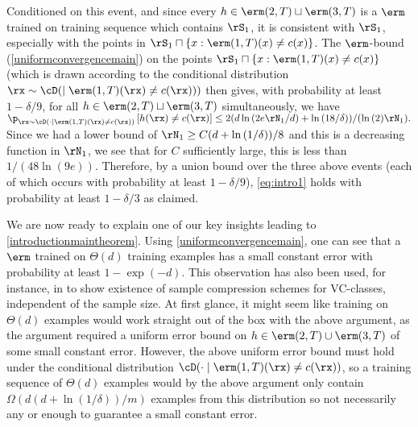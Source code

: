Conditioned on this event, and since every $h\in \erm(2,T)\sqcup\erm(3,T)$ is a $ \erm $ trained on training sequence which contains $\rS_{1}$, it is consistent with $ \rS_{1}$, especially with the points in $\rS_{1}\sqcap \{x: \erm(1,T)(x)\not=c(x) \}$. The $ \erm $-bound (\cref{uniformconvergencemain}) on the points $\rS_{1}\sqcap \{x: \erm(1,T)(x)\not=c(x) \}$ (which is drawn according to the conditional distribution $\rx\sim\cD(\mid \erm(1,T)(\rx)\not=c(\rx)))
$ then gives, with probability at least $1-\delta/9$, for all $h\in \erm(2,T)\sqcup\erm(3,T)$ simultaneously, we have
$\p_{\rx\sim\cD(\cdot \mid \erm(1,T)(\rx)\not=c(\rx))}\left[h(\rx)\not=c(\rx)\right]\leq 2(d\ln{\left(2e \rN_{1}/d \right)}+\ln{\left(18/\delta \right)})/(\ln{\left(2 \right)}\rN_{1}).$ Since we had a lower bound of $\rN_{1}\geq C(d+ \ln{\left(1/\delta \right)} )/8$ and this is a decreasing function in $\rN_{1}$, we see that for $C$ sufficiently large, this is less than $1/(48\ln{\left(9e \right)})$. Therefore, by a union bound over the three above events (each of which occurs with probability at least $1-\delta/9$), \cref{eq:intro1} holds with probability at least $1-\delta/3$ as claimed. 

We are now ready to explain one of our key insights leading to \cref{introductionmaintheorem}. Using \cref{uniformconvergencemain}, one can see that a $ \erm $ trained on $ \Theta(d) $ training examples has a small constant error with probability at least $ 1-\exp(-d) $. This observation has also been used, for instance, in \cite{samplecompressionschemesamirmoran} to show existence of sample compression schemes for VC-classes, independent of the sample size. At first glance, it might seem like training on $ \Theta(d) $ examples would work straight out of the box with the above argument, as the argument required a uniform error bound on $h\in \erm(2,T)\cup \erm(3,T) $ of some small constant error. However, the above uniform error bound must hold under the conditional distribution $ \cD(\cdot \mid \erm(1,T)(\rx)\not=c(\rx))$, so a training sequence of $\Theta(d) $ examples would by the above argument only contain $ \Omega(d(d+\ln{\left(1/\delta \right)})/m) $ examples from this distribution so not necessarily any or enough to guarantee a small constant error. 

